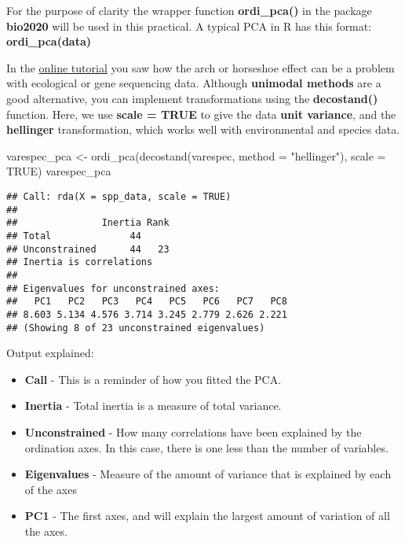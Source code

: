 \documentclass[
]{article}
\newenvironment{Shaded}{\begin{snugshade}}{\end{snugshade}}
\newcommand{\AttributeTok}[1]{\textcolor[rgb]{0.77,0.63,0.00}{#1}}
\newcommand{\ConstantTok}[1]{\textcolor[rgb]{0.00,0.00,0.00}{#1}}
\newcommand{\FunctionTok}[1]{\textcolor[rgb]{0.00,0.00,0.00}{#1}}
\newcommand{\NormalTok}[1]{#1}
\newcommand{\OtherTok}[1]{\textcolor[rgb]{0.56,0.35,0.01}{#1}}
\newcommand{\StringTok}[1]{\textcolor[rgb]{0.31,0.60,0.02}{#1}}
\providecommand{\tightlist}{%
  \setlength{\itemsep}{0pt}\setlength{\parskip}{0pt}}
\begin{document}
For the purpose of clarity the wrapper function \textbf{ordi\_pca()} in
the package \textbf{bio2020} will be used in this practical. A typical
PCA in R has this format: \textbf{ordi\_pca(data)}

In the
\href{https://naturalandenvironmentalscience.shinyapps.io/Unconstrained/}{online
tutorial} you saw how the arch or horseshoe effect can be a problem with
ecological or gene sequencing data. Although \textbf{unimodal methods}
are a good alternative, you can implement transformations using the
\textbf{decostand()} function. Here, we use \textbf{scale = TRUE} to
give the data \textbf{unit variance}, and the \textbf{hellinger}
transformation, which works well with environmental and species data.

\begin{Shaded}
\begin{Highlighting}[]
\NormalTok{varespec\_pca }\OtherTok{\textless{}{-}} \FunctionTok{ordi\_pca}\NormalTok{(}\FunctionTok{decostand}\NormalTok{(varespec, }\AttributeTok{method =} \StringTok{"hellinger"}\NormalTok{), }\AttributeTok{scale =} \ConstantTok{TRUE}\NormalTok{)}
\NormalTok{varespec\_pca}
\end{Highlighting}
\end{Shaded}

\begin{verbatim}
## Call: rda(X = spp_data, scale = TRUE)
## 
##               Inertia Rank
## Total              44     
## Unconstrained      44   23
## Inertia is correlations 
## 
## Eigenvalues for unconstrained axes:
##   PC1   PC2   PC3   PC4   PC5   PC6   PC7   PC8 
## 8.603 5.134 4.576 3.714 3.245 2.779 2.626 2.221 
## (Showing 8 of 23 unconstrained eigenvalues)
\end{verbatim}

Output explained:

\begin{itemize}
\tightlist
\item
  \textbf{Call} - This is a reminder of how you fitted the PCA.
\item
  \textbf{Inertia} - Total inertia is a measure of total variance.
\item
  \textbf{Unconstrained} - How many correlations have been explained by
  the ordination axes. In this case, there is one less than the number
  of variables.
\item
  \textbf{Eigenvalues} - Measure of the amount of variance that is
  explained by each of the axes
\item
  \textbf{PC1} - The first axes, and will explain the largest amount of
  variation of all the axes.
\end{itemize}
\end{document}
